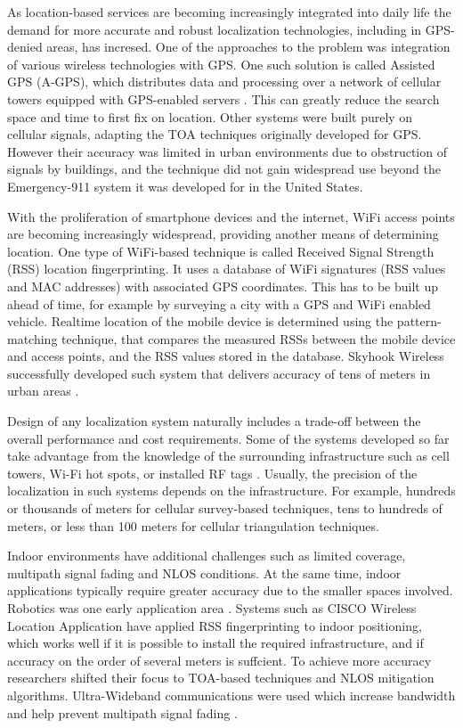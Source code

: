 As location-based services are becoming increasingly integrated into daily life  the demand for more accurate and robust localization technologies, including in GPS-denied areas, has incresed. One of the approaches to the problem was integration of various wireless technologies with GPS. One such solution is called Assisted GPS (A-GPS), which distributes data and processing over a network of cellular towers equipped with GPS-enabled servers \cite{AGPS}. This can greatly reduce the search space and time to first fix on location. Other systems were built purely on cellular signals, adapting the TOA techniques originally developed for GPS. However their accuracy was limited in urban environments due to obstruction of signals by buildings, and the technique did not gain widespread use beyond the Emergency-911 system it was developed for in the United States.


With the proliferation of smartphone devices and the internet, WiFi access points are becoming increasingly widespread, providing another means of determining location. One type of WiFi-based technique is called Received Signal Strength (RSS) location fingerprinting. It uses a database of WiFi signatures (RSS values and MAC addresses) with associated GPS coordinates. This has to be built up ahead of time, for example by surveying a city with a GPS and WiFi enabled vehicle. 
Realtime location of the mobile device is determined using the pattern-matching technique, that compares the measured RSSs between the mobile device and access points, and the RSS values stored in the database. Skyhook Wireless successfully developed such system that delivers accuracy of tens of meters in urban areas \cite{Skyhook}. 

Design of any localization system naturally includes a trade-off between the overall performance and cost requirements. Some of the systems developed so far take advantage from the knowledge of the surrounding infrastructure such as
cell towers, Wi-Fi hot spots, or installed RF tags \cite{GeoLoc}. Usually, the precision of the localization in such systems depends on the infrastructure. For example,  hundreds or thousands of meters for cellular survey-based techniques, tens to hundreds of meters, or less than 100 meters for cellular triangulation techniques.


Indoor environments have additional challenges such as limited coverage, multipath signal fading and NLOS conditions. At the same time, indoor applications typically require greater accuracy due to the smaller spaces involved. Robotics was one early application area \cite{Durant}. Systems such as CISCO Wireless Location Application \cite{CiscoWLA} have applied RSS fingerprinting to indoor positioning, which works well if it is possible to install the required infrastructure, and if accuracy on the order of several meters is suffcient. To achieve more accuracy researchers shifted their focus to TOA-based techniques and NLOS mitigation algorithms. Ultra-Wideband communications were used which increase bandwidth and help prevent multipath signal fading \cite{AlaviUWB}.

